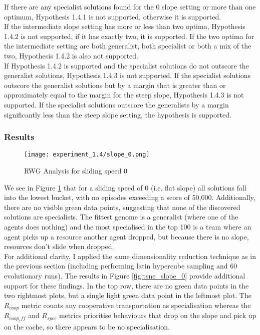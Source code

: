 \documentclass[12pt]{article}
\begin{document}
If there are any specialist solutions found for the 0 slope setting or more than one optimum, Hypothesis 1.4.1 is not supported, otherwise it is supported.\\

If the intermediate slope setting has more or less than two optima, Hypothesis 1.4.2 is not supported, if it has exactly two, it is supported.
If the two optima for the intermediate setting are both generalist, both specialist or both a mix of the two, Hypothesis 1.4.2 is also not supported.\\

If Hypothesis 1.4.2 is supported and the specialist solutions do not outscore the generalist solutions, Hypothesis 1.4.3 is not supported.
If the specialist solutions outscore the generalist solutions but by a margin that is greater than or approximately equal to the margin for the steep slope, Hypothesis 1.4.3 is not supported.
If the specialist solutions outscore the generalists by a margin significantly less than the steep slope setting, the hypothesis is supported.\\

\subsubsection{Results}

\begin{figure}[h]
\centering
\texttt{[image: experiment\_1.4/slope\_0.png]}
\caption{RWG Analysis for sliding speed 0}
\label{fig:slope_0_rwg}
\end{figure}

We see in Figure \ref{fig:slope_0_rwg} that for a sliding speed of 0 (i.e. flat slope) all solutions fall into the lowest bucket, with no episodes exceeding a score of 50,000.
Additionally, there are no visible green data points, suggesting that none of the discovered solutions are specialists.
The fittest genome is a generalist (where one of the agents does nothing) and the most specialised in the top 100 is a team where an agent picks up a resource another agent dropped, but because there is no slope, resources don't slide when dropped.\\

For additional clarity, I applied the same dimensionality reduction technique as in the previous section (including performing latin hypercube sampling and 60 evolutionary runs).
The results in Figure \ref{fig:tsne_slope_0} provide additional support for these findings.
In the top row, there are no green data points in the two rightmost plots, but a single light green data point in the leftmost plot.
The $R_{coop}$ metric counts any cooperative transportation as specialisation whereas the $R_{coop_eff}$ and $R_{spec}$ metrics prioritise behaviours that drop on the slope and pick up on the cache, so there appears to be no specialisation.\\
\end{document}
